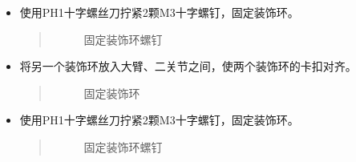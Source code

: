 \documentclass[a4paper,11pt,english,openany,oneside]{sphinxmanual}
\begin{document}
\begin{itemize}
\begin{itemize}
\begin{quote}
\begin{figure}[H]
\noindent{}
\caption{固定装饰环}\label{\detokenize{_u66f4_u6362_u5173_u8282:id148}}\end{figure}
\end{quote}

\item {} 
\sphinxAtStartPar
使用PH1十字螺丝刀拧紧2颗M3十字螺钉，固定装饰环。
\begin{quote}

\begin{figure}[H]
\centering
\capstart

\noindent{}
\caption{固定装饰环螺钉}\label{\detokenize{_u66f4_u6362_u5173_u8282:id149}}\end{figure}
\end{quote}

\item {} 
\sphinxAtStartPar
将另一个装饰环放入大臂、二关节之间，使两个装饰环的卡扣对齐。
\begin{quote}

\begin{figure}[H]
\centering
\capstart

\noindent{}
\caption{固定装饰环}\label{\detokenize{_u66f4_u6362_u5173_u8282:id150}}\end{figure}
\end{quote}

\item {} 
\sphinxAtStartPar
使用PH1十字螺丝刀拧紧2颗M3十字螺钉，固定装饰环。
\begin{quote}

\begin{figure}[H]
\centering
\capstart

\noindent{}
\caption{固定装饰环螺钉}\label{\detokenize{_u66f4_u6362_u5173_u8282:id151}}\end{figure}
\end{quote}

\end{itemize}

\end{itemize}
\end{document}
